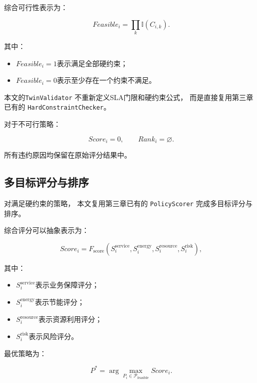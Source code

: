 \documentclass[lang=cn,12pt]{elegantbook}
\begin{document}
综合可行性表示为：

\begin{equation}
Feasible_i
=
\prod_{k}
\mathbb{I}
\left(
C_{i,k}
\right).
\label{eq:twin_policy_feasibility}
\end{equation}

其中：

\begin{itemize}
    \item $Feasible_i=1$表示满足全部硬约束；
    \item $Feasible_i=0$表示至少存在一个约束不满足。
\end{itemize}

本文的\texttt{TwinValidator}
不重新定义SLA门限和硬约束公式，
而是直接复用第三章已有的
\texttt{HardConstraintChecker}。

对于不可行策略：

\begin{equation}
Score_i=0,
\qquad
Rank_i=\varnothing.
\label{eq:twin_infeasible_policy_result}
\end{equation}

所有违约原因均保留在原始评分结果中。


\subsection*{多目标评分与排序}

对满足硬约束的策略，
本文复用第三章已有的
\texttt{PolicyScorer}
完成多目标评分与排序。

综合评分可以抽象表示为：

\begin{equation}
Score_i
=
F_{\mathrm{score}}
\left(
S_i^{\mathrm{service}},
S_i^{\mathrm{energy}},
S_i^{\mathrm{resource}},
S_i^{\mathrm{risk}}
\right),
\label{eq:twin_policy_score}
\end{equation}

其中：

\begin{itemize}
    \item $S_i^{\mathrm{service}}$表示业务保障评分；
    \item $S_i^{\mathrm{energy}}$表示节能评分；
    \item $S_i^{\mathrm{resource}}$表示资源利用评分；
    \item $S_i^{\mathrm{risk}}$表示风险评分。
\end{itemize}

最优策略为：

\begin{equation}
P^{*}
=
\arg\max_{P_i\in\mathcal{P}_{\mathrm{feasible}}}
Score_i.
\label{eq:twin_best_policy_selection}
\end{equation}
\end{document}
